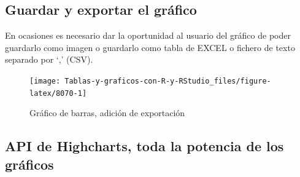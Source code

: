 \documentclass[
]{book}
\newenvironment{Shaded}{\begin{snugshade}}{\end{snugshade}}
\newcommand{\AttributeTok}[1]{\textcolor[rgb]{0.77,0.63,0.00}{#1}}
\newcommand{\ConstantTok}[1]{\textcolor[rgb]{0.00,0.00,0.00}{#1}}
\newcommand{\FunctionTok}[1]{\textcolor[rgb]{0.00,0.00,0.00}{#1}}
\newcommand{\NormalTok}[1]{#1}
\newcommand{\SpecialCharTok}[1]{\textcolor[rgb]{0.00,0.00,0.00}{#1}}
\newcommand{\StringTok}[1]{\textcolor[rgb]{0.31,0.60,0.02}{#1}}
\begin{document}
\hypertarget{guardar-y-exportar-el-gruxe1fico}{%
\subsection{Guardar y exportar el gráfico}\label{guardar-y-exportar-el-gruxe1fico}}

En ocasiones es necesario dar la oportunidad al usuario del gráfico de poder guardarlo como imagen o guardarlo como tabla de EXCEL o fichero de texto separado por `,' (CSV).

\begin{Shaded}
\end{Shaded}

\begin{figure}[H]

{\centering \texttt{[image: Tablas-y-graficos-con-R-y-RStudio\_files/figure-latex/8070-1]} 

}

\caption{Gráfico de barras, adición de exportación}\label{fig:8070}
\end{figure}

\hypertarget{api-de-highcharts-toda-la-potencia-de-los-gruxe1ficos}{%
\subsection{API de Highcharts, toda la potencia de los gráficos}\label{api-de-highcharts-toda-la-potencia-de-los-gruxe1ficos}}
\end{document}
